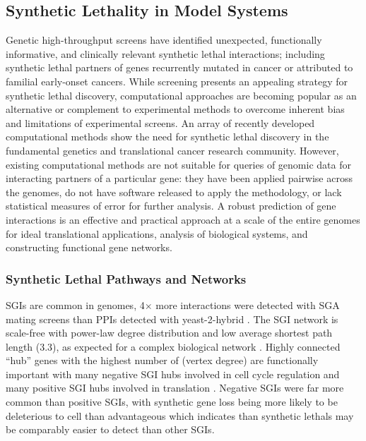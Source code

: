 \subsection{Synthetic Lethality in Model Systems}
Genetic \glspl{high-throughput screen} have identified unexpected, functionally informative, and clinically relevant \gls{synthetic lethal} interactions; including \gls{synthetic lethal} partners of genes recurrently mutated in cancer or attributed to \gls{familial} early-onset cancers. While screening presents an appealing strategy for \gls{synthetic lethal} discovery, computational approaches are becoming popular as an alternative or complement to experimental methods to overcome inherent bias and limitations of experimental screens. An array of recently developed computational methods \citep{Wang2013, Tiong2014, Jerby2014, Lu2015, Wappett2014} show the need for \gls{synthetic lethal} discovery in the fundamental genetics and translational cancer research community. However, existing computational methods are not suitable for queries of \gls{genomic} data for interacting partners of a particular gene: they have been applied pairwise across the \glspl{genome}, do not have software released to apply the methodology, or lack statistical measures of error for further analysis. A robust prediction of gene interactions is an effective and practical approach at a scale of the entire \glspl{genome} for ideal translational applications, analysis of biological systems, and constructing functional gene networks.

\subsubsection{Synthetic Lethal Pathways and Networks}
\glspl{SGI} are common in \glspl{genome}, 4$\times$ more interactions were detected with \gls{SGA} mating screens than \glspl{PPI} detected with yeast-2-hybrid \citep{Tong2004}. The \gls{SGI} network is \gls{scale-free} with power-law  degree distribution and low average \gls{shortest path} length (3.3), as expected for a complex biological network \citep{Barabasi2004}. Highly connected ``hub'' genes with the highest number of  (\gls{vertex degree}) are functionally important with many negative \gls{SGI} hubs involved in cell cycle regulation and many positive \gls{SGI} hubs involved in translation \citep{Baryshnikova2010b, Costanzo2010}. Negative \glspl{SGI} were far more common than positive \glspl{SGI}, with synthetic gene loss being more likely to be deleterious to cell than advantageous which indicates than \glspl{synthetic lethal} may be comparably easier to detect than other \glspl{SGI}. 

